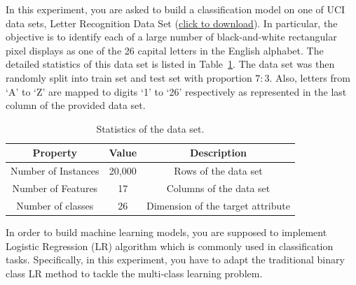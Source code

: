 \documentclass[11pt, a4paper, UTF8]{ctexart}
\begin{document}
In this experiment, you are asked to build a classification model on one of UCI data sets, Letter Recognition Data Set
(\href{http://lamda.nju.edu.cn/ml2019/ML2019-PS2-dataset.zip}{click to download}). In particular, the objective is to identify each of a large number of black-and-white
rectangular pixel displays as one of the 26 capital letters in the English alphabet. The detailed statistics of this data set is listed in Table~\ref{tab:dataset}. The data set was then randomly split into train set and test set with proportion $7:3$. Also, letters from `A' to `Z' are mapped to digits `1' to `26' respectively as represented in the last column of the provided data set.


\begin{table}[!ht]
	\centering
	\caption{Statistics of the data set.}
	\vspace{2mm}
	\label{tab:dataset}
	\begin{tabular}{|c|c|c|}
		\hline
		Property & Value & Description\\
		\hline
		Number of Instances & 20,000 & Rows of the data set\\
		\hline
		Number of Features & 17 & Columns of the data set\\
		\hline
		Number of classes & 26 & Dimension of the target attribute \\
		\hline
	\end{tabular}
\end{table}


In order to build machine learning models, you are supposed to implement Logistic Regression (LR) algorithm which is commonly used in classification tasks. Specifically, in this experiment, you have to adapt the traditional binary class LR method to tackle the multi-class learning problem. 
\end{document}
